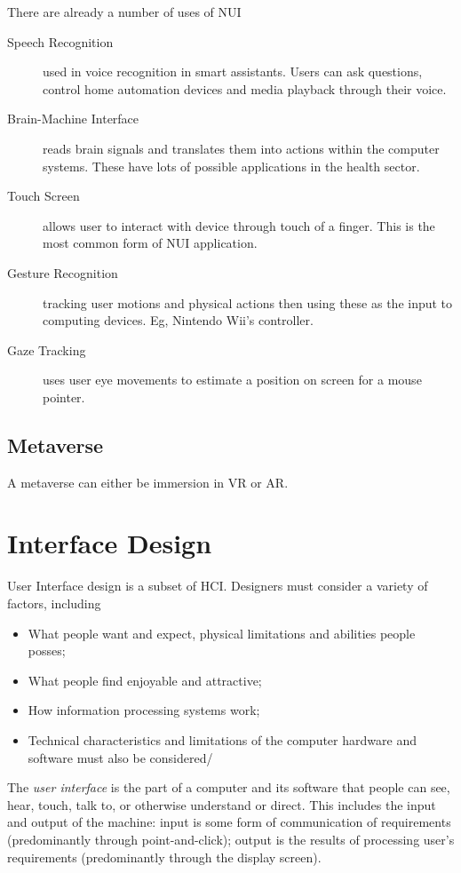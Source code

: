 There are already a number of uses of NUI
\begin{description}
    \item[Speech Recognition] used in voice recognition in smart assistants. Users can ask questions, control home automation devices and media playback through their voice. 
    \item[Brain-Machine Interface] reads brain signals and translates them into actions within the computer systems. These have lots of possible applications in the health sector.
    \item[Touch Screen] allows user to interact with device through touch of a finger. This is the most common form of NUI application.
    \item[Gesture Recognition] tracking user motions and physical actions then using these as the input to computing devices. Eg, Nintendo Wii's controller.
    \item[Gaze Tracking] uses user eye movements to estimate a position on screen for a mouse pointer.
\end{description}

\subsection{Metaverse}

A metaverse can either be immersion in VR or AR. 

\section{Interface Design}
User Interface design is a subset of HCI. Designers must consider a variety of factors, including
\begin{itemize}
    \item What people want and expect, physical limitations and abilities people posses;
    \item What people find enjoyable and attractive;
    \item How information processing systems work;
    \item Technical characteristics and limitations of the computer hardware and software must also be considered/
\end{itemize}

The \textit{user interface} is the part of a computer and its software that people can see, hear, touch, talk to, or otherwise understand or direct. This includes the input and output of the machine: input is some form of communication of requirements (predominantly through point-and-click); output is the results of processing user's requirements (predominantly through the display screen).

